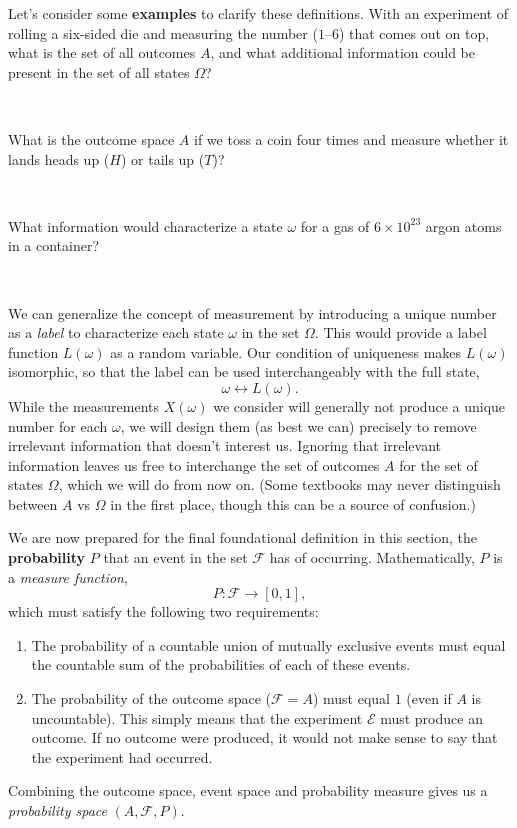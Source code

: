 \documentclass[12 pt]{article}
\newcommand{\cE}{\ensuremath{\mathcal E} }
\newcommand{\cF}{\ensuremath{\mathcal F} }
\newcommand{\om}{\ensuremath{\omega} }
\newcommand{\Om}{\ensuremath{\Omega} }
\newcommand{\llra}{\ensuremath{\longleftrightarrow} }
\newcommand{\X}{\ensuremath{\!\times\!} }
\begin{document}
Let's consider some \textbf{examples} to clarify these definitions.
With an experiment of rolling a six-sided die and measuring the number ($1$--$6$) that comes out on top, what is the set of all outcomes $A$, and what additional information could be present in the set of all states $\Om$?
\begin{mdframed}
  \ \\[100 pt]
\end{mdframed}
What is the outcome space $A$ if we toss a coin four times and measure whether it lands heads up ($H$) or tails up ($T$)?
\begin{mdframed}
  \ \\[100 pt]
\end{mdframed}
\newpage %
\noindent What information would characterize a state \om for a gas of $6\X 10^{23}$ argon atoms in a container?
\begin{mdframed}
  \ \\[100 pt]
\end{mdframed}

We can generalize the concept of measurement by introducing a unique number as a \textit{label} to characterize each state \om in the set $\Om$.
This would provide a label function $L(\om)$ as a random variable.
Our condition of uniqueness makes $L(\om)$ isomorphic, so that the label can be used interchangeably with the full state,
\begin{equation*}
  \om \llra L(\om).
\end{equation*}
While the measurements $X(\om)$ we consider will generally not produce a unique number for each $\om$, we will design them (as best we can) precisely to remove irrelevant information that doesn't interest us.
Ignoring that irrelevant information leaves us free to interchange the set of outcomes $A$ for the set of states $\Om$, which we will do from now on.
(Some textbooks may never distinguish between $A$ vs \Om in the first place, though this can be a source of confusion.)

We are now prepared for the final foundational definition in this section, the \textbf{probability} $P$ that an event in the set \cF has of occurring.
Mathematically, $P$ is a \textit{measure function},
\begin{equation*}
  P: \cF \to [0, 1],
\end{equation*}
which must satisfy the following two requirements: \\[-24 pt]
\begin{enumerate}
  \item The probability of a countable union of mutually exclusive events must equal the countable sum of the probabilities of each of these events.
  \item The probability of the outcome space ($\cF = A$) must equal $1$ (even if $A$ is uncountable).
        This simply means that the experiment \cE must produce an outcome.
        If no outcome were produced, it would not make sense to say that the experiment had occurred.
\end{enumerate}
Combining the outcome space, event space and probability measure gives us a \textit{probability space} $(A, \cF, P)$.
\end{document}
